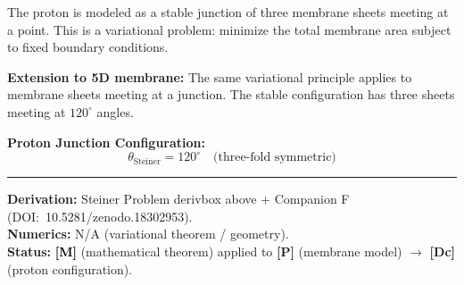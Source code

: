 \documentclass[11pt,a4paper]{article}
\newcommand{\tagP}{\textcolor{red!70!black}{\textbf{[P]}}}
\newcommand{\tagDc}{\textcolor{blue!70!black}{\textbf{[Dc]}}}
\newcommand{\tagM}{\textcolor{black}{\textbf{[M]}}}
\begin{document}
The proton is modeled as a stable junction of three membrane sheets meeting at a point. This is a variational problem: minimize the total membrane area subject to fixed boundary conditions.


\textbf{Extension to 5D membrane:} The same variational principle applies to membrane sheets meeting at a junction. The stable configuration has three sheets meeting at $120^\circ$ angles.

\begin{resultbox}
\textbf{Proton Junction Configuration:}
\begin{equation}
    \theta_{\text{Steiner}} = 120^\circ \quad \text{(three-fold symmetric)}
    \label{eq:steiner_angle}
\end{equation}

\vspace{0.3em}\hrule\vspace{0.3em}
\textbf{Derivation:} Steiner Problem derivbox above + Companion F (DOI:~10.5281/zenodo.18302953).\\
\textbf{Numerics:} N/A (variational theorem / geometry).\\
\textbf{Status:} \tagM{} (mathematical theorem) applied to \tagP{} (membrane model) $\to$ \tagDc{} (proton configuration).
\end{resultbox}
\end{document}
